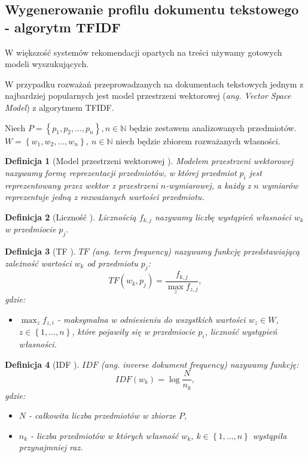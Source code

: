 \documentclass[12pt,a4paper]{report}
\newtheorem{df}{Definicja}[chapter]
\newcommand{\set}[1]{\left\lbrace {#1} \right\rbrace}
\newcommand{\setN}{\mathbb{N}}
\newcommand{\setPrzedmioty}{\mathit{P}}
\newcommand{\setWlasnosci}{\mathit{W}}
\begin{document}
\subsection{Wygenerowanie profilu dokumentu tekstowego - algorytm TFIDF}
W większość systemów rekomendacji opartych na treści używamy gotowych modeli wyszukujących. 

W przypadku rozważań przeprowadzanych na dokumentach tekstowych jednym z najbardziej popularnych jest model przestrzeni wektorowej (\textit{ang. Vector Space Model}) z algorytmem TFIDF.
\bigskip

Niech $\setPrzedmioty = \set{p_1, p_2, \ldots ,p_n}, n\in \setN$ będzie zestawem analizowanych przedmiotów. $W = \set{w_1, w_2, \ldots ,w_n}, \: n\in \setN $ niech będzie zbiorem rozważanych własności.

\begin{df}[Model przestrzeni wektorowej {\citep[Sec 3.3.1.1]{rsh}}]
Modelem przestrzeni wektorowej nazywamy formę reprezentacji przedmiotów, w której przedmiot $p_i$ jest reprezentowany przez wektor z przestrzeni $n$-wymiarowej, a każdy z $n$ wymiarów reprezentuje jedną z rozważanych wartości przedmiotu. 
\end{df}

\begin{df}[Liczność {\citep[Sec 3.3.1.1]{rsh}}]
Licznością $f_{k,j}$ nazywamy liczbę wystąpień własności $w_k$ w przedmiocie $p_j$.
\end{df}

\begin{df}[TF {\citep[Sec 3.3.1.1]{rsh}}]
$TF$ (ang. \textit{term frequency}) nazywamy funkcję przedstawiającą zależność wartości $w_k$ od przedmiotu $p_j$:
$$
TF(w_k, p_j)=\frac{f_{k,j}}{\max_{z}f_{z,j}},
$$
gdzie:
\begin{itemize}
\item $\max_{z}f_{z,i}$ - maksymalna w odniesieniu do wszystkich wartości $w_z \in \setWlasnosci$, $z \in \set{1, \ldots, n}$, które pojawiły się w przedmiocie $p_i$, liczność wystąpień własności. 
\end{itemize}
\end{df}

\begin{df}[IDF {\citep[Sec 3.3.1.1]{rsh}}]
$IDF$ (ang. \textit{inverse dokument frequency}) nazywamy funkcję:
$$
IDF(w_k) = \log \frac{N}{n_k},
$$
gdzie:
\begin{itemize}
\item $N$ - całkowita liczba przedmiotów w zbiorze $\setPrzedmioty$,
\item $n_k$ - liczba przedmiotów w których własność $w_k$, $k \in \set{1, \ldots, n}$ wystąpiła przynajmniej raz.
\end{itemize}
\end{df}
\end{document}

